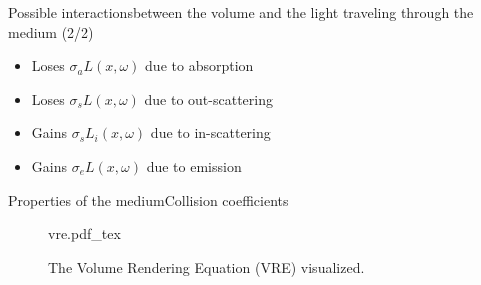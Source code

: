 \documentclass[
  english,            %
  aspectratio=169,    %
]{tumbeamer}
\newcommand{\incfig}[1]{%
    \def\svgwidth{\columnwidth}
    {#1.pdf_tex}
}
\begin{document}
\begin{frame}{Possible interactions}{between the volume and the light
    traveling through the medium (2/2)}
\begin{figure}[ht]
    \centering
    
    \label{fig:interactions}
\end{figure}
    \begin{itemize}
        \item Loses $\sigma_a L(x, \omega)$ due to absorption
        \item Loses $\sigma_s L(x, \omega)$ due to out-scattering
        \item Gains $\sigma_s L_i(x, \omega)$ due to in-scattering
        \item Gains $\sigma_e L(x, \omega)$ due to emission
    \end{itemize}
\end{frame}

\begin{frame}{Properties of the medium}{Collision coefficients}
    \begin{figure}[ht]
        \centering
        \incfig{vre}
        \caption{The Volume Rendering Equation (VRE) visualized.}
        \label{fig:vre}
    \end{figure}
\end{frame}
\end{document}
